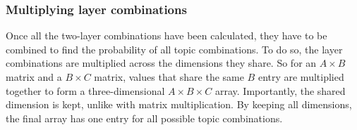 \subsubsection{Multiplying layer combinations}\label{app:multiply_layer_combs}
Once all the two-layer combinations have been calculated, they have to be combined to find the probability of all topic combinations.
To do so, the layer combinations are multiplied across the dimensions they share.
So for an $A\times B$ matrix and a $B\times C$ matrix, values that share the same $B$ entry are multiplied together to form a three-dimensional $A\times B\times C$ array.
Importantly, the shared dimension is kept, unlike with matrix multiplication.
By keeping all dimensions, the final array has one entry for all possible topic combinations.
